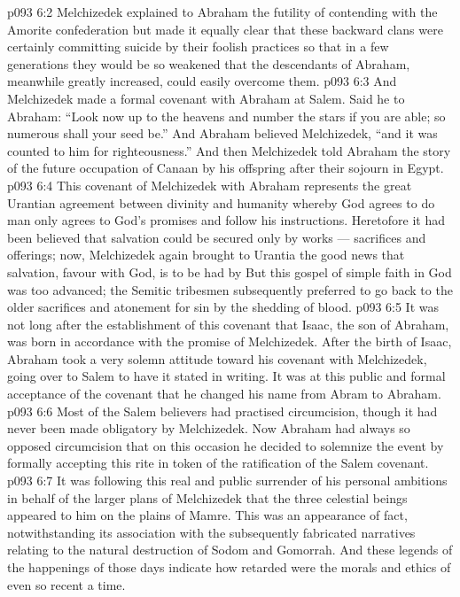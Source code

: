 \vs p093 6:2 Melchizedek explained to Abraham the futility of contending with the Amorite confederation but made it equally clear that these backward clans were certainly committing suicide by their foolish practices so that in a few generations they would be so weakened that the descendants of Abraham, meanwhile greatly increased, could easily overcome them.
\vs p093 6:3 And Melchizedek made a formal covenant with Abraham at Salem. Said he to Abraham: “Look now up to the heavens and number the stars if you are able; so numerous shall your seed be.” And Abraham believed Melchizedek, “and it was counted to him for righteousness.” And then Melchizedek told Abraham the story of the future occupation of Canaan by his offspring after their sojourn in Egypt.
\vs p093 6:4 \pc This covenant of Melchizedek with Abraham represents the great Urantian agreement between divinity and humanity whereby God agrees to do  man only agrees to  God’s promises and follow his instructions. Heretofore it had been believed that salvation could be secured only by works --- sacrifices and offerings; now, Melchizedek again brought to Urantia the good news that salvation, favour with God, is to be had by  But this gospel of simple faith in God was too advanced; the Semitic tribesmen subsequently preferred to go back to the older sacrifices and atonement for sin by the shedding of blood.
\vs p093 6:5 It was not long after the establishment of this covenant that Isaac, the son of Abraham, was born in accordance with the promise of Melchizedek. After the birth of Isaac, Abraham took a very solemn attitude toward his covenant with Melchizedek, going over to Salem to have it stated in writing. It was at this public and formal acceptance of the covenant that he changed his name from Abram to Abraham.
\vs p093 6:6 Most of the Salem believers had practised circumcision, though it had never been made obligatory by Melchizedek. Now Abraham had always so opposed circumcision that on this occasion he decided to solemnize the event by formally accepting this rite in token of the ratification of the Salem covenant.
\vs p093 6:7 It was following this real and public surrender of his personal ambitions in behalf of the larger plans of Melchizedek that the three celestial beings appeared to him on the plains of Mamre. This was an appearance of fact, notwithstanding its association with the subsequently fabricated narratives relating to the natural destruction of Sodom and Gomorrah. And these legends of the happenings of those days indicate how retarded were the morals and ethics of even so recent a time.
